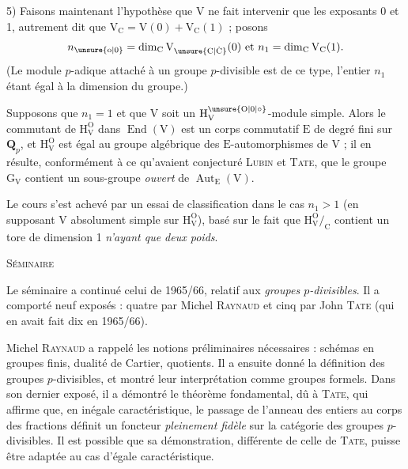 5) Faisons maintenant l’hypothèse que $\mathrm{V}$ ne fait intervenir que les exposants 0 et 1, autrement dit que $\mathrm{V}_{\mathrm{C}}=\mathrm{V}(0)+\mathrm{V}_{\mathrm{C}}(1)$ ; posons
\[
n_{\unsure{\mathrm{o}|0}}=\dim_{\mathrm{C}}\mathrm{V}_{\unsure{\mathrm{C}|\dot{\mathrm{C}}}}(0)\ \text{et}\ n_1=\dim_{\mathrm{C}}\mathrm{V}_{\mathrm{C}}(1).
\]
(Le module $p$-adique attaché à un groupe $p$-divisible est de ce type, l’entier $n_1$ étant égal à la dimension du groupe.)

Supposons que $n_1=1$ et que $\mathrm{V}$ soit un $\mathrm{H}_{\mathrm{V}}^{\unsure{\mathrm{O}|0|\circ}}$-module simple. Alors le commutant de $\mathrm{H}_{\mathrm{V}}^{\mathrm{O}}$ dans $\operatorname{End}(\mathrm{V})$ est un corps commutatif $\mathrm{E}$ de degré fini sur $\mathbf{Q}_p$, et $\mathrm{H}_{\mathrm{V}}^{\mathrm{O}}$ est égal au groupe algébrique des $\mathrm{E}$-automorphismes de $\mathrm{V}$ ; il en résulte, conformément à ce qu’avaient conjecturé \textsc{Lubin} et \textsc{Tate}, que le groupe $\mathrm{G}_{\mathrm{V}}$ contient un sous-groupe \textit{ouvert} de $\operatorname{Aut}_{\mathrm{E}}(\mathrm{V})$.

Le cours s’est achevé par un essai de classification dans le cas $n_1>1$ (en supposant $\mathrm{V}$ absolument simple sur $\mathrm{H}_{\mathrm{V}}^{\mathrm{O}}$), basé sur le fait que $\mathrm{H}_{\mathrm{V}}^{\mathrm{O}}/_{\mathrm{C}}$ contient un tore de dimension 1 \textit{n’ayant que deux poids}.
\margin{\handwritten{$\left.\vphantom{\begin{matrix}1\\1\end{matrix}}\right]$ voir à ce sujet le livre de T. Springer sur \unsure{les|ls} alg. de Jordan récemment paru chez Springer-Verlag}}

\begin{center}\textsc{Séminaire}\end{center}

Le séminaire a continué celui de 1965/66, relatif aux \textit{groupes $p$-divisibles}. Il a comporté neuf exposés : quatre par Michel \textsc{Raynaud} et cinq par John \textsc{Tate} (qui en avait fait dix en 1965/66).

Michel \textsc{Raynaud} a rappelé les notions préliminaires nécessaires : schémas en groupes finis, dualité de Cartier, quotients. Il a ensuite donné la définition des groupes $p$-divisibles, et montré leur interprétation comme groupes formels. Dans son dernier exposé, il a démontré le théorème fondamental, dû à \textsc{Tate}, qui affirme que, en inégale caractéristique, le passage de l’anneau des entiers au corps des fractions définit un foncteur \textit{pleinement fidèle} sur la catégorie des groupes $p$-divisibles. Il est possible que sa démonstration, différente de celle de \textsc{Tate}, puisse être adaptée au cas d’égale caractéristique.

